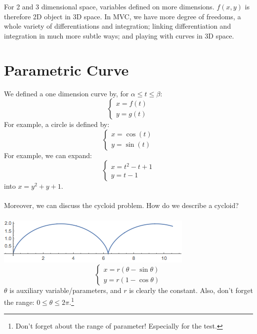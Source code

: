 \documentclass[11pt, oneside]{article}   	%
\begin{document}
For 2 and 3 dimensional space, variables defined on more dimensions. $f(x,y)$ is therefore 2D object in 3D space. In MVC, we have more degree of freedoms, a whole variety of differentiations and integration; linking differentiation and integration in much more subtle ways; and playing with curves in 3D space. 
\section{Parametric Curve}
We defined a one dimension curve by, for $\alpha \le t \le \beta$:
\begin{equation}
  \begin{cases}
    x = f(t)\\
    y = g(t)
  \end{cases}
\end{equation}
For example, a circle is defined by:
\begin{equation}
  \begin{cases}
    x = \cos(t)\\
    y = \sin(t)
  \end{cases}
\end{equation}
For example, we can expand:
\begin{equation}
  \begin{cases}
    x = t^2 - t + 1\\
    y = t -1 
  \end{cases}
\end{equation}
into $x = y^2 + y + 1$.
\paragraph{}

Moreover, we can discuss the cycloid problem. How do we describe a cycloid? 
\paragraph{}

\includegraphics[scale = 0.5]{Cycloid}
\begin{equation}
  \begin{cases}
    x = r(\theta - \sin{\theta})\\
    y = r(1-\cos{\theta})
  \end{cases}
\end{equation}
$\theta$ is auxiliary variable/parameters, and $r$ is clearly the constant. Also, don't forget the range: $0 \le \theta \le 2\pi$.\footnote{Don't forget about the range of parameter!  Especially for the test.}
\end{document}
